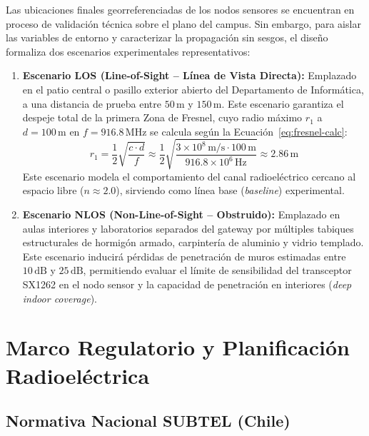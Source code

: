 \documentclass[12pt,oneside,openany,spanish,oldfontcommands]{memoir}
\begin{document}
Las ubicaciones finales georreferenciadas de los nodos sensores se encuentran en proceso de
validación técnica sobre el plano del campus. Sin embargo, para aislar las variables de entorno
y caracterizar la propagación sin sesgos, el diseño formaliza dos escenarios experimentales
representativos:
\begin{enumerate}
    \item \textbf{Escenario LOS (Line-of-Sight -- Línea de Vista Directa):} Emplazado en el
    patio central o pasillo exterior abierto del Departamento de Informática, a una distancia de
    prueba entre $50\,\text{m}$ y $150\,\text{m}$. Este escenario garantiza el despeje total de la
    primera Zona de Fresnel, cuyo radio máximo $r_1$ a $d = 100\,\text{m}$ en $f = 916.8\,\text{MHz}$
    se calcula según la Ecuación~\eqref{eq:fresnel-calc}:
    \begin{equation}\label{eq:fresnel-calc}
        r_1 = \frac{1}{2} \sqrt{\frac{c \cdot d}{f}} \approx \frac{1}{2} \sqrt{\frac{3 \times 10^8\,\text{m/s} \cdot 100\,\text{m}}{916.8 \times 10^6\,\text{Hz}}} \approx 2.86\,\text{m}
    \end{equation}
    Este escenario modela el comportamiento del canal radioeléctrico cercano al espacio libre
    ($n \approx 2.0$), sirviendo como línea base (\textit{baseline}) experimental.

    \item \textbf{Escenario NLOS (Non-Line-of-Sight -- Obstruido):} Emplazado en aulas interiores
    y laboratorios separados del gateway por múltiples tabiques estructurales de hormigón armado,
    carpintería de aluminio y vidrio templado. Este escenario inducirá pérdidas de penetración de
    muros estimadas entre $10\,\text{dB}$ y $25\,\text{dB}$, permitiendo evaluar el límite de
    sensibilidad del transceptor SX1262 en el nodo sensor y la capacidad de penetración en
    interiores (\textit{deep indoor coverage}).
\end{enumerate}

\section{Marco Regulatorio y Planificación Radioeléctrica}\label{sec:marco-regulatorio}

\subsection{Normativa Nacional SUBTEL (Chile)}
\end{document}
